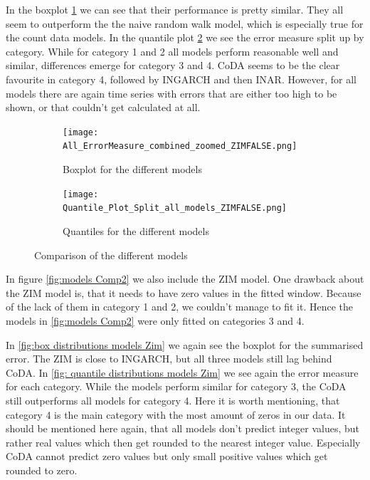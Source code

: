 In the boxplot \ref{fig:box distributions models} we can see that their performance is pretty similar. They all seem to outperform the the naive random walk model, which is especially true for the count data models. 
In the quantile plot \ref{fig: quantile distributions models} we see the error measure split up by category. While for category 1 and 2 all models perform reasonable well and similar, differences emerge for category 3 and 4. CoDA seems to be the clear favourite in category 4, followed by INGARCH and then INAR. However, for all models there are again time series with errors that are either too high to be shown, or that couldn't get calculated at all. 
\begin{figure}[htb!]
\centering
\begin{subfigure}[b]{0.8\textwidth}
\texttt{[image: All\_ErrorMeasure\_combined\_zoomed\_ZIMFALSE.png]}
\caption{Boxplot for the different models}
\label{fig:box distributions models}
\end{subfigure}
\hfill
\begin{subfigure}[b]{0.8\textwidth}
\texttt{[image: Quantile\_Plot\_Split\_all\_models\_ZIMFALSE.png]}
\caption{Quantiles for the different models}
\label{fig: quantile distributions models}
\end{subfigure}
\hfill
\caption{Comparison of the different models}
\label{fig:models Comp1}
\end{figure}

In figure \ref{fig:models Comp2} we also include the ZIM model. One drawback about the ZIM model is, that it needs to have zero values in the fitted window. Because of the lack of them in category 1 and 2, we couldn't manage to fit it. Hence the models in \ref{fig:models Comp2} were only fitted on categories 3 and 4. 

In \ref{fig:box distributions models Zim} we again see the boxplot for the summarised error. The ZIM is close to INGARCH, but all three models still lag behind CoDA. In \ref{fig: quantile distributions models Zim} we see again the error measure for each category. While the models perform similar for category 3, the CoDA still outperforms all models for category 4. Here it is worth mentioning, that category 4 is the main category with the most amount of zeros in our data. It should be mentioned here again, that all models don't predict integer values, but rather real values which then get rounded to the nearest integer value. Especially CoDA cannot predict zero values but only small positive values which get rounded to zero.

